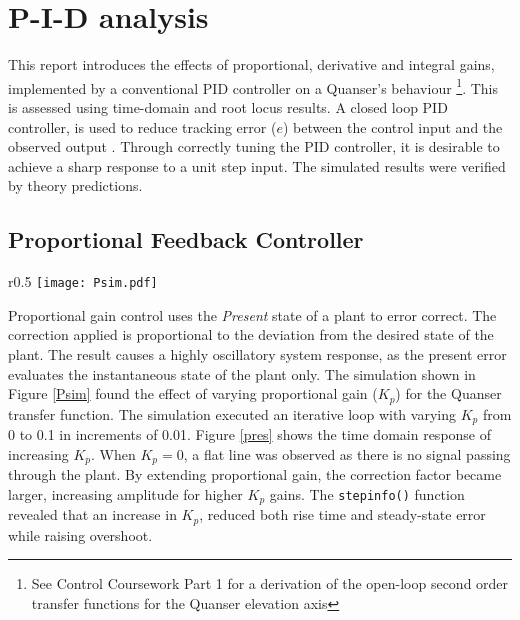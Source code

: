 \section{P-I-D analysis}\label{p-i-d-analysis}

This report introduces the effects of proportional, derivative and
integral gains, implemented by a conventional PID controller on a
Quanser's behaviour
\footnote{See Control Coursework Part 1 for a derivation of the open-loop second order transfer functions for the Quanser elevation axis}.
This is assessed using time-domain and root locus results. A closed loop
PID controller, is used to reduce tracking error (\(e\)) between the
control input and the observed output \cite{ControlT54:online}. Through
correctly tuning the PID controller, it is desirable to achieve a sharp
response to a unit step input. The simulated results were verified by
theory predictions.

\subsection{Proportional Feedback
Controller}\label{proportional-feedback-controller}

\begin{wrapfigure}{r}{0.5\textwidth}
\centering
\vspace{-35pt} %
\texttt{[image: Psim.pdf]}
\vspace{-25pt}
\caption{Proportional Feedback Controller}
\label{Psim}
\vspace{-15pt}
\end{wrapfigure}

Proportional gain control uses the \emph{Present} state of a plant to
error correct. The correction applied is proportional to the deviation
from the desired state of the plant. The result causes a highly
oscillatory system response, as the present error evaluates the
instantaneous state of the plant only. The simulation shown in Figure
\ref{Psim} found the effect of varying proportional gain (\(K_p\)) for
the Quanser transfer function. The simulation executed an iterative loop
with varying \(K_p\) from 0 to 0.1 in increments of 0.01. Figure
\ref{pres} shows the time domain response of increasing \(K_p\). When
\(K_p = 0\), a flat line was observed as there is no signal passing
through the plant. By extending proportional gain, the correction factor
became larger, increasing amplitude for higher \(K_p\) gains. The
\texttt{stepinfo()} function revealed that an increase in \(K_p\),
reduced both rise time and steady-state error while raising overshoot.

